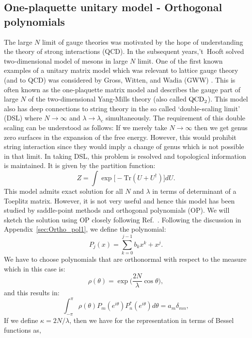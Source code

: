 \documentclass[letter,11pt]{article}
\begin{document}
\subsection{One-plaquette unitary model - Orthogonal polynomials} 
The large $N$ limit of gauge theories was motivated by the hope of understanding 
the theory of strong interactions (QCD). 
In the subsequent years,'t~Hooft solved two-dimensional model of mesons in large $N$ 
limit. One of the first known examples of a unitary matrix model which was relevant to 
lattice gauge theory (and to QCD) was considered by Gross, Witten, and 
Wadia (GWW) \cite{Gross:1980he, Wadia:2012fr}.
This is often known as the one-plaquette matrix model and describes 
the gauge part of large $N$ of the two-dimensional Yang-Mills theory (also called $\rm{QCD}_{2}$).
This model also has deep connections to string theory in the so 
called `double-scaling limit' (DSL) where $N \to \infty$ and $\lambda \to \lambda_{c}$ 
simultaneously. The requirement of this double scaling can be understood as follows: 
If we merely take $N \to \infty$ then we get genus zero surfaces in the 
expansion of the free energy. However, this would prohibit string interaction 
since they would imply a change of genus which is not possible in that limit. 
In taking DSL, this problem is resolved and topological information is maintained. 
It is given by the partition function: 
\begin{equation}
	Z = \int \exp \Big[- \mbox{Tr} (U + U^{\dagger})   \Big] dU. 
\end{equation}
This model admits exact solution for all $N$ and $\lambda$ in terms of determinant of a 
Toeplitz matrix. However, it is not very useful and hence this model has been studied by 
saddle-point methods and orthogonal polynomials (OP). We will sketch the solution using OP 
closely following Ref.~\cite{Goldschmidt:1979hq}. 
Following the discussion in Appendix~\ref{sec:Ortho_pol1}, we define the polynomial:
\begin{equation}
	P_{j}(x) = \sum_{k=0}^{j-1} b_{k} x^{k} + x^{j}. 
\end{equation} 
We have to choose polynomials that are orthonormal with respect to the measure which in this case is:
\begin{equation}
	\rho(\theta) = \exp\Big(\frac{2N}{\lambda} \cos \theta \Big),
\end{equation}
and this results in:
\begin{equation}
	\int_{-\pi}^{\pi} \rho(\theta) P_{m}(e^{i\theta}) P_{n}^{*}(e^{i\theta}) d\theta= a_{m} \delta_{mn},
\end{equation}
If we define $\kappa = 2N/\lambda$, then we have for the representation in terms of 
Bessel functions as, 
\end{document}
